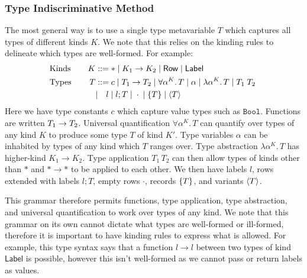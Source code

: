\documentclass[acmsmall, 9pt]{article}
\begin{document}
\subsubsection{Type Indiscriminative Method}
\label{sssec:tau-method}
The most general way is to use a single type metavariable $T$ which captures all types of different kinds $K$. We note that this relies on the kinding rules to delineate which types are well-formed. For example:
\begin{align*}
  &\text{Kinds} \quad &K &::= * \; | \; K_1 \rightarrow K_2 \; | \; \mathsf{Row} \; | \; \mathsf{Label} \span\span \\
  &\text{Types} \quad &T &::= c \; | \; \tyFun{T_1}{T_2} \; | \; \forall \alpha^K . \, T\; | \; \alpha \; | \; \lambda \alpha^K. \, T \;| \; T_1 \; T_2 \;    \span\span\\
  &&&| \quad  l \; | \; l ; T \; | \; \cdot \; | \;\tyBrace{T} \; | \; \tyAngle{T} \\
\end{align*}
Here we have type constants $c$ which capture value types such as $\texttt{Bool}$. Functions are written ${T_1}\rightarrow{T_2}$. Universal quantification $\forall \alpha^K. \, T$ can quantify over types of any kind $K$ to produce some type $T$ of kind $K'$. Type variables $\alpha$ can be inhabited by types of any kind which $T$ ranges over. Type abstraction $\lambda \alpha^K. \, T$ has higher-kind $K_1 \rightarrow K_2$. Type application $T_1 \, T_2$ can then allow types of kinds other than $*$ and $* \rightarrow *$ to be applied to each other. We then have labels $l$, rows extended with labels $l; T$, empty rows $\cdot$, records $\{ T \}$, and variants $\langle T \rangle$.

This grammar therefore permits functions, type application, type abstraction, and universal quantification to work over types of any kind. We note that this grammar on its own cannot dictate what types are well-formed or ill-formed, therefore it is important to have kinding rules to express what is allowed. For example, this type syntax says that a function $l \rightarrow l$ between two types of kind $\mathsf{Label}$ is possible, however this isn't well-formed as we cannot pass or return labels as values.
\end{document}
